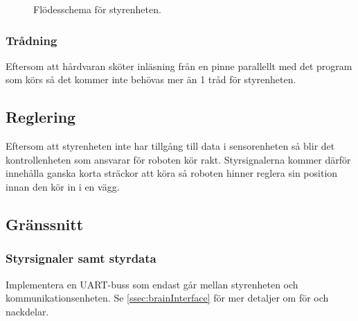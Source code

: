 \documentclass[a4paper,11pt]{article}
\begin{document}
\begin{figure}[h!]
	\caption{Flödesschema för styrenheten.}
	\label{fig:styrenhetFlowchart}
\end{figure}

\subsubsection{Trådning}
Eftersom att hårdvaran sköter inläsning från en pinne parallellt med det program som körs så det kommer inte behövas mer än 1 tråd för styrenheten.

\subsection{Reglering}
Eftersom att styrenheten inte har tillgång till data i sensorenheten så blir det kontrollenheten som ansvarar för roboten kör rakt. Styrsignalerna kommer därför innehålla ganska korta sträckor att köra så roboten hinner reglera sin position innan den kör in i en vägg. 

\subsection{Gränssnitt} \label{ssec:controlInterface}

\subsubsection{Styrsignaler samt styrdata}
Implementera en UART-buss som endast går mellan styrenheten och kommunikationsenheten. Se \ref{ssec:brainInterface} för mer detaljer om för och nackdelar.
\end{document}

